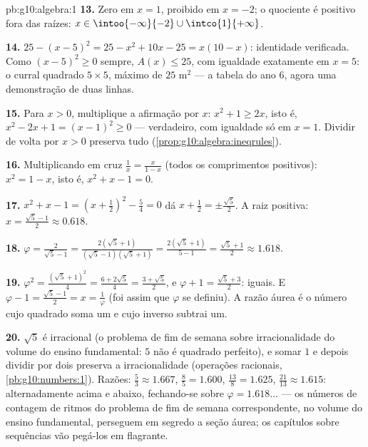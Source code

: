 \begin{solution}{pb:g10:algebra:1}
\textbf{13.} Zero em $x = 1$, proibido em $x = -2$; o quociente
é positivo fora das raízes:
$x \in \intoo{-\infty}{-2} \cup \intco{1}{+\infty}$.

\textbf{14.} $25 - (x - 5)^2 = 25 - x^2 + 10x - 25 =
x(10 - x)$: identidade verificada. Como $(x-5)^2 \geq 0$
sempre, $A(x) \leq 25$, com igualdade exatamente em $x = 5$: o
curral quadrado $5 \times 5$, máximo de $25$ m$^2$ --- a tabela
do ano 6, agora uma demonstração de duas linhas.

\textbf{15.} Para $x > 0$, multiplique a afirmação por $x$:
$x^2 + 1 \geq 2x$, isto é, $x^2 - 2x + 1 = (x - 1)^2 \geq 0$
--- verdadeiro, com igualdade só em $x = 1$. Dividir de volta
por $x > 0$ preserva tudo
(\cref{prop:g10:algebra:ineqrules}).

\textbf{16.} Multiplicando em cruz $\frac1x = \frac{x}{1 - x}$
(todos os comprimentos positivos): $x^2 = 1 - x$, isto é,
$x^2 + x - 1 = 0$.

\textbf{17.} $x^2 + x - 1 = \left(x + \frac12\right)^2 -
\frac54 = 0$ dá $x + \frac12 = \pm\frac{\sqrt5}{2}$. A raiz
positiva: $x = \frac{\sqrt5 - 1}{2} \approx 0.618$.

\textbf{18.} $\varphi = \frac{2}{\sqrt5 - 1} =
\frac{2(\sqrt5 + 1)}{(\sqrt5 - 1)(\sqrt5 + 1)}
= \frac{2(\sqrt5 + 1)}{5 - 1} = \frac{\sqrt5 + 1}{2}
\approx 1.618$.

\textbf{19.} $\varphi^2 = \frac{(\sqrt5 + 1)^2}{4} =
\frac{6 + 2\sqrt5}{4} = \frac{3 + \sqrt5}{2}$, e
$\varphi + 1 = \frac{\sqrt5 + 3}{2}$: iguais. E
$\varphi - 1 = \frac{\sqrt5 - 1}{2} = x = \frac1\varphi$ (foi
assim que $\varphi$ se definiu). A razão áurea é o número cujo
quadrado soma um e cujo inverso subtrai um.

\textbf{20.} $\sqrt5$ é irracional (o problema de fim de semana
sobre irracionalidade do volume do ensino fundamental: $5$ não
é quadrado perfeito), e somar $1$ e depois dividir por dois
preserva a irracionalidade (operações racionais,
\cref{pb:g10:numbers:1}). Razões: $\frac53 \approx 1.667$,
$\frac85 = 1.600$, $\frac{13}{8} = 1.625$,
$\frac{21}{13} \approx 1.615$: alternadamente acima e abaixo,
fechando-se sobre $\varphi = 1.618\ldots$ --- os números de
contagem de ritmos do problema de fim de semana correspondente,
no volume do ensino fundamental, perseguem em segredo a seção
áurea; os capítulos sobre sequências vão pegá-los em
flagrante.
\end{solution}
